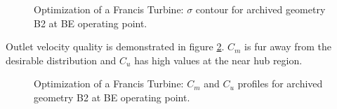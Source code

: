 \begin{figure}[h!]
\begin{minipage}[b]{1\linewidth}
 \centering
\end{minipage}
\caption{Optimization of a Francis Turbine: $\sigma$ contour for archived geometry B2 at BE operating point.}
\label{Francis-B2-BE}
\end{figure}

Outlet velocity quality is demonstrated in figure \ref{Francis-B2-OUT}. $C_m$ is fur away from the desirable distribution and $C_u$ has high values at the near hub region.   

\begin{figure}[h!]
\begin{minipage}[b]{1\linewidth}
 \centering
\end{minipage}
\caption{Optimization of a Francis Turbine: $C_m$ and $C_u$ profiles for archived geometry B2 at BE operating point.}
\label{Francis-B2-OUT}
\end{figure}

